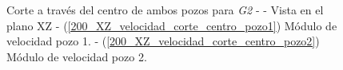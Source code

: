 \documentclass[10pt,a4paper,final]{article}
\begin{document}
%
%
\begin{figure}[tbhp]
   \centering
   \hspace{0.1\linewidth}
    \caption{Corte a través del centro de ambos pozos para \emph{G2} -  - Vista en el plano XZ - (\ref{200_XZ_velocidad_corte_centro_pozo1}) Módulo de velocidad pozo 1. - (\ref{200_XZ_velocidad_corte_centro_pozo2}) Módulo de velocidad pozo 2.}
   \label{200_XZ_velocidad_corte_centro_pozos}                %
\end{figure}
\end{document}
